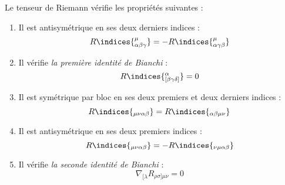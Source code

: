 \begin{theoremframe}
    \begin{propri}
        \label{prop:tenseur de Riemann}
        Le tenseur de Riemann vérifie les propriétés suivantes :
        \begin{enumerate}[label=(\roman*)]
            \item Il est antisymétrique en ses deux derniers indices :
            \begin{equation}
                R\indices{^{\mu}_{\alpha \beta \gamma}} = -R\indices{^{\mu}_{\alpha \gamma \beta}}
            \end{equation}
            \item Il vérifie \emph{la première identité de Bianchi} :
            \begin{equation}
                R\indices{^{\alpha}_{[\beta \gamma \delta]}} = 0
            \end{equation}
            \item Il est symétrique par bloc en ses deux premiers et deux derniers indices : 
            \begin{equation}
                R\indices{_{\mu \nu \alpha \beta}} = R\indices{_{\alpha \beta \mu \nu}}
             \end{equation}
            \item Il est antisymétrique en ses deux premiers indices : \begin{equation}
                R\indices{_{\mu \nu \alpha \beta}} = - R\indices{_{\nu \mu \alpha \beta}}
            \end{equation}
            \item Il vérifie \emph{la seconde identité de Bianchi} :
            \begin{equation}
                \nabla_{[\lambda} R_{\rho \sigma] \mu \nu} = 0
            \end{equation}
        \end{enumerate}
    \end{propri}
\end{theoremframe}
